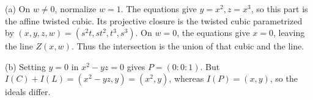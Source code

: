 (a) On $w\ne0$, normalize $w=1$. The equations give $y=x^2,z=x^3$, so this part is the affine twisted cubic. Its projective closure is the twisted cubic parametrized by $(x,y,z,w)=(s^2t,st^2,t^3,s^3)$. On $w=0$, the equations give $x=0$, leaving the line $Z(x,w)$. Thus the intersection is the union of that cubic and the line.

(b) Setting $y=0$ in $x^2-yz=0$ gives $P=(0:0:1)$. But $I(C)+I(L)=(x^2-yz,y)=(x^2,y)$, whereas $I(P)=(x,y)$, so the ideals differ.
